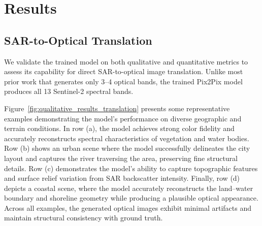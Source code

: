 \section{Results}
\subsection{SAR-to-Optical Translation}
We validate the trained model on both qualitative and quantitative metrics to assess its capability for direct SAR-to-optical image translation. Unlike most prior work that generates only 3–4 optical bands, the trained Pix2Pix model produces all 13 Sentinel-2 spectral bands.

Figure~\ref{fig:qualitative_results_translation} presents some representative examples demonstrating the model's performance on diverse geographic and terrain conditions. In row (a), the model achieves strong color fidelity and accurately reconstructs spectral characteristics of vegetation and water bodies. Row (b) shows an urban scene where the model successfully delineates the city layout and captures the river traversing the area, preserving fine structural details. Row (c) demonstrates the model's ability to capture topographic features and surface relief variation from SAR backscatter intensity. Finally, row (d) depicts a coastal scene, where the model accurately reconstructs the land--water boundary and shoreline geometry while producing a plausible optical appearance. Across all examples, the generated optical images exhibit minimal artifacts and maintain structural consistency with ground truth.

